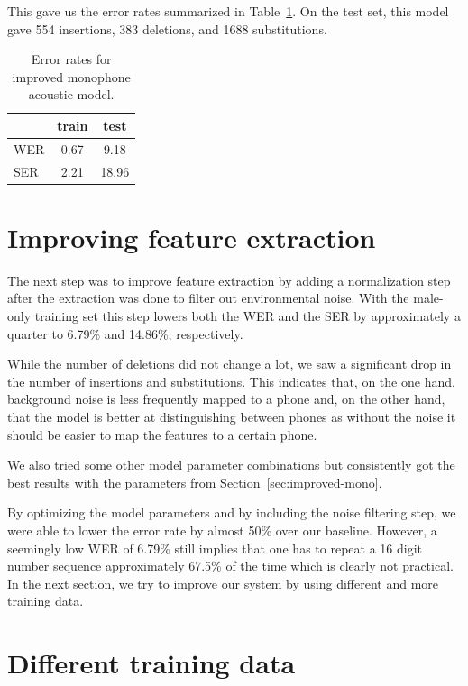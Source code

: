 \documentclass[twocolumn, 11pt]{article}
\begin{document}
This gave us the error rates summarized in Table~\ref{tab:wer-mono}. On the test
set, this model gave 554 insertions, 383 deletions, and 1688 substitutions.

\begin{table}[h]\centering
  \begin{tabular}{lcc}
    \toprule
    & train & test \\
    \midrule
    WER & 0.67 & 9.18 \\
    SER & 2.21 & 18.96 \\
    \bottomrule
  \end{tabular}
  \caption{Error rates for improved monophone acoustic
  model.}\label{tab:wer-mono}
\end{table}

\section{Improving feature extraction}

The next step was to improve feature extraction by adding a normalization step
after the extraction was done to filter out environmental noise. With the
male-only training set this step lowers both the WER and the SER by
approximately a quarter to 6.79\% and 14.86\%, respectively.

While the number of deletions did not change a lot, we saw a significant drop in
the number of insertions and substitutions. This indicates that, on the one
hand, background noise is less frequently mapped to a phone and, on the other
hand, that the model is better at distinguishing between phones as without the
noise it should be easier to map the features to a certain phone.

We also tried some other model parameter combinations but consistently got the
best results with the parameters from Section~\ref{sec:improved-mono}.

By optimizing the model parameters and by including the noise filtering step, we
were able to lower the error rate by almost 50\% over our baseline. However, a
seemingly low WER of 6.79\% still implies that one has to repeat a 16 digit
number sequence approximately 67.5\% of the time which is clearly not practical.
In the next section, we try to improve our system by using different and more
training data.

\section{Different training data}\label{sec:datasets}
\end{document}
